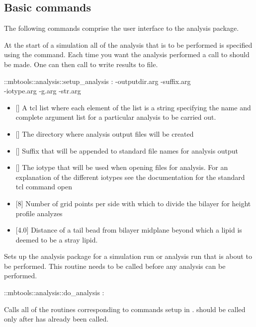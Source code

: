\subsection{Basic commands}
The following commands comprise the user interface to the analysis package.

At the start of a simulation all of the analysis that is to be
performed is specified using the 
command. Each time you want the analysis performed a call to
 should be made. One can then call
 to write results to file.

\begin{code} 
  ::mbtools::analysis::setup_analysis : -outputdir.arg -suffix.arg \\
  -iotype.arg -g.arg -str.arg
\end{code}
\begin{itemize}
\item {} [] A tcl list where each element of
  the list is a string specifying the name and complete argument list
  for a particular analysis to be carried out.
\item {} [] The directory where analysis
  output files will be created
\item {} [] Suffix that will be appended to
  standard file names for analysis output
\item {} [] The iotype that will be used when opening
  files for analysis. For an explanation of the different iotypes see
  the documentation for the standard tcl command open
\item {} [8] Number of grid points per side with which to divide
  the bilayer for height profile analyzes
\item {} [4.0] Distance of a tail bead from bilayer midplane
  beyond which a lipid is deemed to be a stray lipid.
\end{itemize}

Sets up the analysis package for a simulation run or analysis run that
is about to be performed. This routine needs to be called before any
analysis can be performed.

\begin{code}
 ::mbtools::analysis::do_analysis :
\end{code}
Calls all of the  routines corresponding to commands
setup in .  should be
called only after  has already been called.

